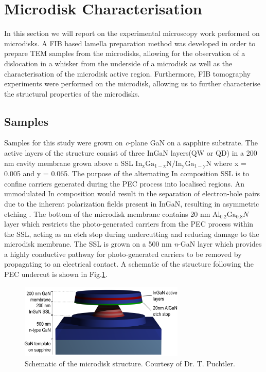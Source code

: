 \section[Experimental]{Microdisk Characterisation}
In this section we will report on the experimental microscopy work performed on microdisks. A FIB based lamella preparation method was developed in order to prepare TEM samples from the microdisks, allowing for the observation of a dislocation in a whisker from the underside of a microdisk as well as the characterisation of the microdisk active region. Furthermore, FIB tomography experiments were performed on the microdisk, allowing us to further characterise the structural properties of the microdisks.

\subsection{Samples}
\label{microdisk samples}
Samples for this study were grown on \textit{c}-plane GaN on a sapphire substrate. The active layers of the structure consist of three InGaN layers(QW or QD) in a 200 nm cavity membrane grown above a SSL $\mathrm{In_{x}Ga_{1-x}N/In_{y}Ga_{1-y}N}$ where x = 0.005 and y = 0.065. The purpose of the alternating In composition SSL is to confine carriers generated during the PEC process into localised regions. An unmodulated In composition would result in the separation of electron-hole pairs due to the inherent polarization fields present in InGaN, resulting in asymmetric etching \cite{El-Ella2011a}. The bottom of the microdisk membrane contains 20 nm $\mathrm{Al_{0.2}Ga_{0.8}}N$ layer which restricts the photo-generated carriers from the PEC process within the SSL, acting as an etch stop during undercutting and reducing damage to the microdisk membrane. The SSL is grown on a 500 nm \textit{n}-GaN layer which provides a highly conductive pathway for photo-generated carriers to be removed by propagating to an electrical contact. A schematic of the structure following the PEC undercut is shown in Fig.\ref{Puchtlerudiskimage}.

\begin{figure}[ht]
	\centering
	\includegraphics[width=0.7\textwidth]{Figs/Ch4/puchtlerimage}
	\caption {Schematic of the microdisk structure. Courtesy of Dr. T. Puchtler.}
	\label{Puchtlerudiskimage}
\end{figure}
\FloatBarrier 
	

